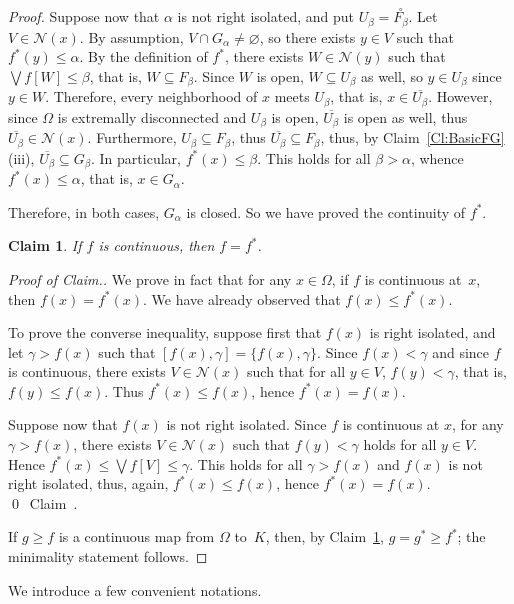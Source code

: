 \documentclass[psamsfonts,reqno]{memo-l}
\theoremstyle{plain}
\newtheorem{claim}{Claim}
\theoremstyle{definition}
\theoremstyle{remark}
\newcommand{\qedc}{{\qed}~{\rm Claim~{\theclaim}.}}
\newenvironment{cproof}
{\begin{proof}[Proof of Claim.]}
{\qedc\renewcommand{\qed}{}\end{proof}}
\numberwithin{equation}{section}
\newcommand{\Nh}{\mathcal{N}}
\newcommand{\oll}[1]{\overline{#1}}
\newcommand{\es}{\varnothing}
\newcommand{\set}[1]{\{#1\}}
\begin{document}
\begin{proof}
Suppose now that $\alpha$ is not right isolated, and put
$U_\beta=\overset{\circ}{F_{\beta}}$. Let $V\in\Nh(x)$. By assumption,
$V\cap G_\alpha\ne\es$, so there exists
$y\in V$ such that $f^*(y)\leq\alpha$. By the definition of $f^*$, there
exists $W\in\Nh(y)$ such that $\bigvee f[W]\leq\beta$,
that is, $W\subseteq F_\beta$. Since $W$ is open, $W\subseteq U_\beta$ as
well, so $y\in U_\beta$ since $y\in W$. Therefore, every neighborhood of $x$
meets $U_\beta$, that is, $x\in\oll{U_\beta}$. However, since $\Omega$ is
extremally disconnected and $U_\beta$ is open, $\oll{U_\beta}$ is open as
well, thus $\oll{U_\beta}\in\Nh(x)$. Furthermore,
$U_\beta\subseteq F_\beta$, thus
$\oll{U_\beta}\subseteq F_\beta$, thus, by Claim~\ref{Cl:BasicFG}(iii),
$\oll{U_\beta}\subseteq G_\beta$. In particular,
$f^*(x)\leq\beta$. This holds for all $\beta>\alpha$, whence
$f^*(x)\leq\alpha$, that is, $x\in G_\alpha$.

Therefore, in both cases, $G_\alpha$ is closed.
So we have proved the continuity of $f^*$.

\begin{claim}\label{Cl:fcontf*}
If $f$ is continuous, then $f=f^*$.
\end{claim}

\begin{cproof}
We prove in fact that for any $x\in\Omega$, if $f$ is continuous at~$x$, then
$f(x)=f^*(x)$. We have already observed that $f(x)\leq f^*(x)$.

To prove the converse inequality, suppose first that $f(x)$ is right isolated,
and let $\gamma>f(x)$ such that $[f(x),\gamma]=\set{f(x),\gamma}$. Since
$f(x)<\gamma$ and since $f$ is continuous, there exists $V\in\Nh(x)$
such that for all $y\in V$, $f(y)<\gamma$, that is, $f(y)\leq f(x)$. Thus
$f^*(x)\leq f(x)$, hence $f^*(x)=f(x)$.

Suppose now that $f(x)$ is not right isolated. Since $f$ is continuous at
$x$, for any $\gamma>f(x)$, there exists $V\in\Nh(x)$ such that
$f(y)<\gamma$ holds for all $y\in V$. Hence $f^*(x)\leq\bigvee
f[V]\leq\gamma$. This holds for all $\gamma>f(x)$ and $f(x)$ is not right
isolated, thus, again, $f^*(x)\leq f(x)$, hence $f^*(x)=f(x)$.
\end{cproof}

If $g\geq f$ is a continuous map from $\Omega$ to~$K$, then, by
Claim~\ref{Cl:fcontf*}, $g=g^*\geq f^*$; the minimality statement follows.
\end{proof}

We introduce a few convenient notations.
\end{document}
